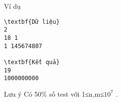Ví dụ  
\begin{verbatim}
\textbf{Dữ liệu}
2
18 1
1 145674807	

\textbf{Kết quả}
19
1000000000
\end{verbatim}
   Lưu ý  
Có 50\% số test với 1≤n,m≤$10^{7}$   .